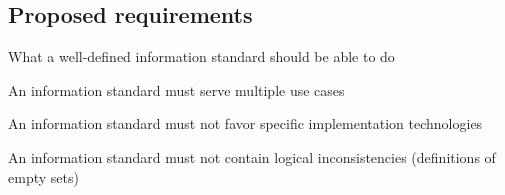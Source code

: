\subsection{Proposed requirements}
\begin{frame}{What a well-defined information standard should be able to do}

    \begin{requirement}\label{req:universal}
        An information standard must serve multiple use cases
    \end{requirement}

    \pause

    \begin{requirement}\label{req:technology}
        An information standard must not favor specific implementation technologies
    \end{requirement}

    \pause

    \begin{requirement}\label{req:consistent}
        An information standard must not contain logical inconsistencies (definitions of empty sets)
    \end{requirement}
\end{frame}

